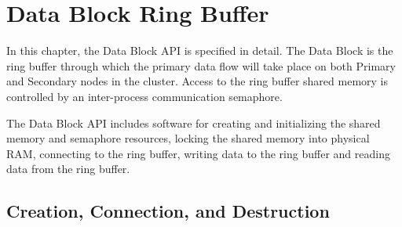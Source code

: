 \chapter{Data Block Ring Buffer}

In this chapter, the Data Block API is specified in detail.  The Data
Block is the ring buffer through which the primary data flow will take
place on both Primary and Secondary nodes in the cluster.  Access to
the ring buffer shared memory is controlled by an inter-process
communication semaphore.

The Data Block API includes software for creating and initializing the
shared memory and semaphore resources, locking the shared memory into
physical RAM, connecting to the ring buffer, writing data to the ring
buffer and reading data from the ring buffer.

\section{Creation, Connection, and Destruction}

